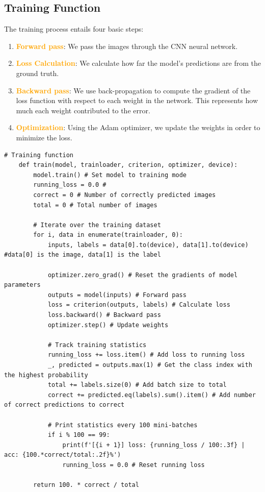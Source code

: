\subsection{Training Function}
The training process entails four basic steps:
\begin{enumerate}
    \item \textcolor{orange}{\textbf{Forward pass}}: We pass the images through the CNN neural network.
    \item \textcolor{orange}{\textbf{Loss Calculation}}: We calculate how far the model's predictions are from the ground truth.
    \item \textcolor{orange}{\textbf{Backward pass}}: We use back-propagation to compute the gradient of the loss function with respect to each weight in the network. This represents how much each weight contributed to the error.
    \item \textcolor{orange}{\textbf{Optimization}}: Using the Adam optimizer, we update the weights in order to minimize the loss.
\end{enumerate}

\begin{lstlisting}[caption={Training Function}, label={lst:training}]
    # Training function
    def train(model, trainloader, criterion, optimizer, device):
        model.train() # Set model to training mode
        running_loss = 0.0 #
        correct = 0 # Number of correctly predicted images
        total = 0 # Total number of images
        
        # Iterate over the training dataset
        for i, data in enumerate(trainloader, 0):
            inputs, labels = data[0].to(device), data[1].to(device) #data[0] is the image, data[1] is the label
            
            optimizer.zero_grad() # Reset the gradients of model parameters
            outputs = model(inputs) # Forward pass
            loss = criterion(outputs, labels) # Calculate loss
            loss.backward() # Backward pass
            optimizer.step() # Update weights
            
            # Track training statistics
            running_loss += loss.item() # Add loss to running loss
            _, predicted = outputs.max(1) # Get the class index with the highest probability
            total += labels.size(0) # Add batch size to total
            correct += predicted.eq(labels).sum().item() # Add number of correct predictions to correct
            
            # Print statistics every 100 mini-batches
            if i % 100 == 99:
                print(f'[{i + 1}] loss: {running_loss / 100:.3f} | acc: {100.*correct/total:.2f}%')
                running_loss = 0.0 # Reset running loss
        
        return 100. * correct / total
\end{lstlisting}


